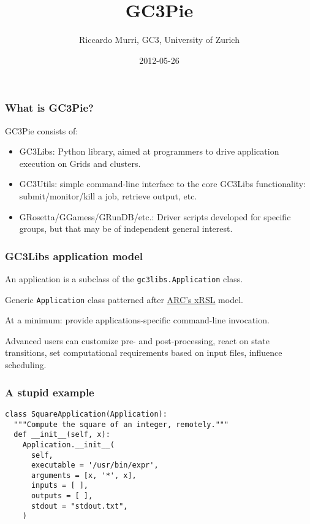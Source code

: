 \documentclass[presentation]{beamer}
\begin{document}
\title{GC3Pie}
\author{Riccardo Murri, GC3, University of Zurich}
\date{2012-05-26}
\maketitle


\begin{frame}
  \frametitle{What is GC3Pie?}
  \label{sec-4}

  GC3Pie consists of:

  \begin{itemize}
  \item GC3Libs: Python library, aimed at programmers to drive application
    execution on Grids and clusters.
  \item GC3Utils: simple command-line interface to the core GC3Libs
    functionality: submit/monitor/kill a job, retrieve output, etc.
  \item GRosetta/GGamess/GRunDB/etc.: Driver scripts developed for
    specific groups, but that may be of independent general interest.
  \end{itemize}
\end{frame}


\begin{frame}
  \frametitle{GC3Libs application model}
  \label{sec-7}

  An application is a subclass of the \texttt{gc3libs.Application} class.

  Generic \texttt{Application} class patterned after \href{http://www.nordugrid.org/documents/xrsl.pdf}{ARC's xRSL} model.

  At a minimum: provide applications-specific command-line invocation.

  Advanced users can customize pre- and post-processing, react on
  state transitions, set computational requirements based on input
  files, influence scheduling.
\end{frame}

\begin{frame}[fragile]
  \frametitle{A stupid example}
  \label{sec-8}

\begin{verbatim}
class SquareApplication(Application):
  """Compute the square of an integer, remotely."""
  def __init__(self, x):
    Application.__init__(
      self,
      executable = '/usr/bin/expr',
      arguments = [x, '*', x],
      inputs = [ ],
      outputs = [ ],
      stdout = "stdout.txt",
    )
\end{verbatim}
\end{frame}
\end{document}
